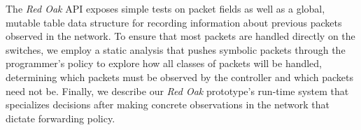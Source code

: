\documentclass[nocopyrightspace]{sigplanconf}
\begin{document}
The \textit{Red Oak} API exposes simple tests on packet fields as well as a global, mutable table data
structure for recording information about previous packets observed in the network.
To ensure that most packets are handled directly on the switches, we employ a static analysis
that pushes symbolic packets through the programmer's policy to explore how all classes of 
packets will be handled, determining which packets must be observed by the controller and which 
packets need not be. Finally, we describe our \textit{Red Oak} prototype's run-time system that 
specializes decisions after making concrete observations in the network that dictate forwarding policy.




\end{document}
